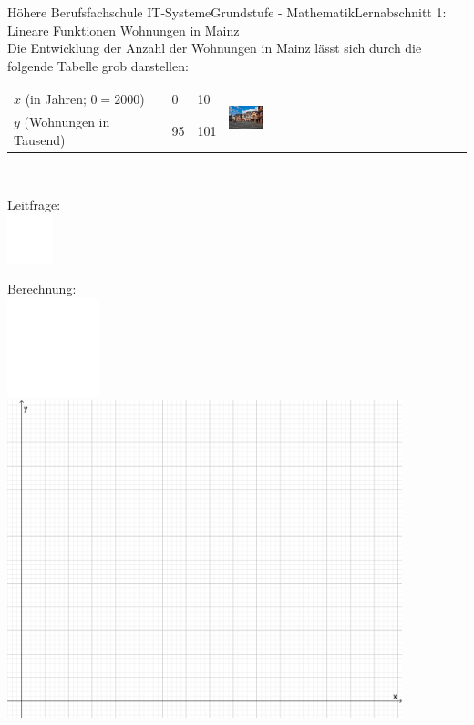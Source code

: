 \documentclass[oneside,openany,headings=optiontotoc,11pt,numbers=noenddot]{scrreprt}
\begin{document}
	\begin{worksheet}{Höhere Berufsfachschule IT-Systeme}{Grundstufe - Mathematik}{Lernabschnitt 1: Lineare Funktionen}
		\noindent
		\LARGE Wohnungen in Mainz\\
		\normalsize
		\noindent
		Die Entwicklung der Anzahl der Wohnungen in Mainz lässt sich durch die folgende Tabelle grob darstellen:\\
		\par\noindent
		\begin{tabularx}{\columnwidth}{|X|l|l|M}
			\(x\) (in Jahren; \(0 = 2000\)) & 0 & 10 & \\
			\(y\) (Wohnungen in Tausend) & 95 & 101 &\\
		\end{tabularx}\\
		\begin{framed}
			\noindent
			\small{\color{codegray}Leitfrage:}\\
			\includegraphics[width=0.1\textwidth]{../../empty.jpg}\\
		\end{framed}
		\begin{framed}
			\noindent
			\small{\color{codegray}Berechnung:}\\
			\includegraphics[width=0.2\textwidth]{../../empty.jpg}\\
			\includegraphics[width=0.86\textwidth]{../99_Bilder/KoordLeer.png}

\end{framed}
\end{worksheet}
\end{document}
